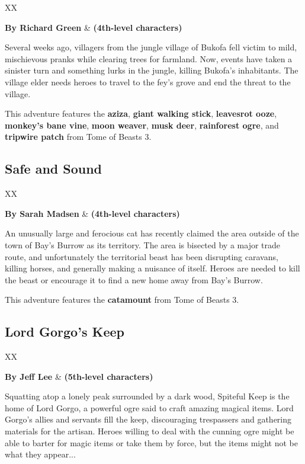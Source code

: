 \documentclass[10pt,a4paper,twoside,bg=print,twocolumn,openany,nodeprecatedcode]{dndbook}
\begin{document}
\begin{DndTable}{XX}

\textbf{By Richard Green} & \textbf{(4th-level characters)}\\
\end{DndTable}

Several weeks ago, villagers from the jungle village of Bukofa fell victim to mild, mischievous pranks while clearing trees for farmland. Now, events have taken a sinister turn and something lurks in the jungle, killing Bukofa's inhabitants. The village elder needs heroes to travel to the fey's grove and end the threat to the village.

This adventure features the \textbf{aziza}, \textbf{giant walking stick}, \textbf{leavesrot ooze}, \textbf{monkey's bane vine}, \textbf{moon weaver}, \textbf{musk deer}, \textbf{rainforest ogre}, and \textbf{tripwire patch} from Tome of Beasts 3.

\subsection{Safe and Sound}

\begin{DndTable}{XX}

\textbf{By Sarah Madsen} & \textbf{(4th-level characters)}\\
\end{DndTable}

An unusually large and ferocious cat has recently claimed the area outside of the town of Bay's Burrow as its territory. The area is bisected by a major trade route, and unfortunately the territorial beast has been disrupting caravans, killing horses, and generally making a nuisance of itself. Heroes are needed to kill the beast or encourage it to find a new home away from Bay's Burrow.

This adventure features the \textbf{catamount} from Tome of Beasts 3.

\subsection{Lord Gorgo's Keep}

\begin{DndTable}{XX}

\textbf{By Jeff Lee} & \textbf{(5th-level characters)}\\
\end{DndTable}

Squatting atop a lonely peak surrounded by a dark wood, Spiteful Keep is the home of Lord Gorgo, a powerful ogre said to craft amazing magical items. Lord Gorgo's allies and servants fill the keep, discouraging trespassers and gathering materials for the artisan. Heroes willing to deal with the cunning ogre might be able to barter for magic items or take them by force, but the items might not be what they appear...
\end{document}
